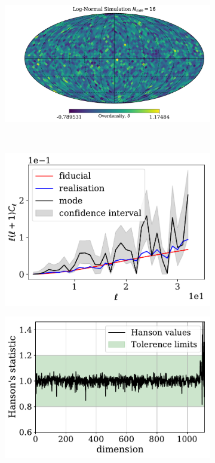 \begin{figure}
\begin{center}
\begin{subfigure}[b]{.5\textwidth}
 \includegraphics[scale=0.35]{BPL-FIGS/Flask-FullSky-N16_map.pdf}
  \caption{}
  \label{fig:BPL:LNFSMAP}
\end{subfigure}\\
\end{center}
\begin{subfigure}{.5\textwidth}
  \centering
  \includegraphics[scale=0.50]{BPL-FIGS/Flask-FullSky-N16clsHPD.pdf}
  \caption{}
\end{subfigure}
\begin{subfigure}{.5\textwidth}
  \centering
  \includegraphics[scale=0.50]{BPL-FIGS/Flask-FullSky-N16_Hanson.pdf}

\end{subfigure}
\end{figure}
